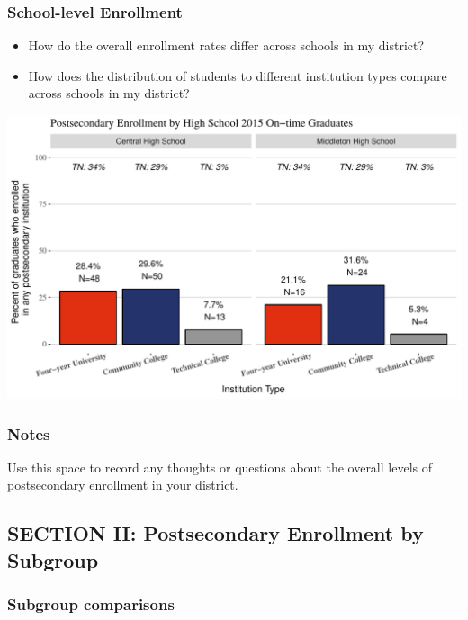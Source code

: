 \documentclass[11pt,]{article}
\providecommand{\tightlist}{%
  \setlength{\itemsep}{0pt}\setlength{\parskip}{0pt}}
\begin{document}
\newpage

\subsubsection{School-level Enrollment}\label{school-level-enrollment}

\begin{itemize}
\tightlist
\item
  How do the overall enrollment rates differ across schools in my
  district?
\item
  How does the distribution of students to different institution types
  compare across schools in my district?
\end{itemize}

\includegraphics{20170424_PSWRR_files/figure-latex/Enrollment by School-1.pdf}

\subsubsection{\texorpdfstring{\textbf{Notes}}{Notes}}\label{notes}

Use this space to record any thoughts or questions about the overall
levels of postsecondary enrollment in your district.

\newpage 

\subsection{SECTION II: Postsecondary Enrollment by
Subgroup}\label{section-ii-postsecondary-enrollment-by-subgroup}

\subsubsection{Subgroup comparisons}\label{subgroup-comparisons}
\end{document}
